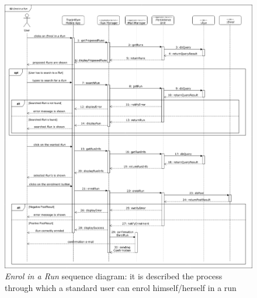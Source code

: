 \begin{figure}[H]
  \begin{center}
  	\includegraphics[width=\textwidth]{./img/sequence/enrolRun.png}
    \hspace{0.05\linewidth}
    \centering
    \caption{\textit{Enrol in a Run} sequence diagram: it is described the process through which a standard user can enrol himself/herself in a run}
		\label{img:enrolRun}
    \end{center}
\end{figure}

